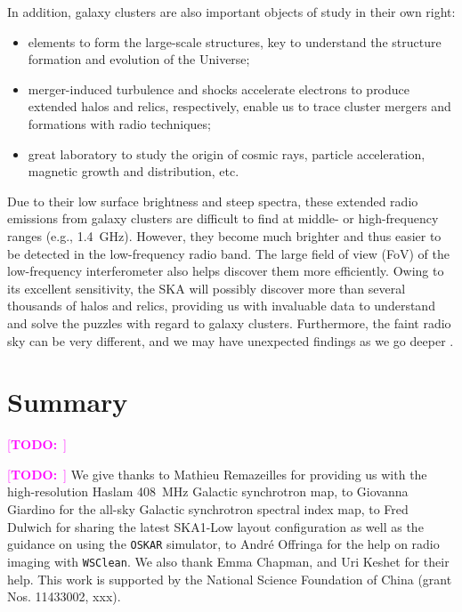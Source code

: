 \documentclass[modern]{aastex62}
\newcommand{\TODO}[1]{\textcolor{magenta}{[\textbf{TODO:}~\uuline{#1}]}}
\begin{document}
In addition, galaxy clusters are also important objects of study in their
own right:
\begin{itemize}
  \item elements to form the large-scale structures, key to understand the
    structure formation and evolution of the Universe;
  \item merger-induced turbulence and shocks accelerate electrons to produce
    extended halos and relics, respectively, enable us to trace cluster
    mergers and formations with radio techniques;
  \item great laboratory to study the origin of cosmic rays, particle
    acceleration, magnetic growth and distribution, etc.
\end{itemize}

Due to their low surface brightness and steep spectra, these extended
radio emissions from galaxy clusters are difficult to find at middle-
or high-frequency ranges (e.g., \SI{1.4}{\GHz}).
However, they become much brighter and thus easier to be detected in
the low-frequency radio band.  The large field of view (FoV) of the
low-frequency interferometer also helps discover them more efficiently.
Owing to its excellent sensitivity, the SKA will possibly discover more
than several thousands of halos and relics, providing us with invaluable
data to understand and solve the puzzles with regard to galaxy clusters.
Furthermore, the faint radio sky can be very different, and we may have
unexpected findings as we go deeper \citep{padovani2016rev,herreraRuiz2017}.


\section{Summary}
\label{sec:summary}

\TODO{Write!!!}


\acknowledgments

\TODO{update}
We give thanks
to Mathieu Remazeilles for providing us with the high-resolution Haslam
\SI{408}{\MHz} Galactic synchrotron map,
to Giovanna Giardino for the all-sky Galactic synchrotron spectral index map,
to Fred Dulwich for sharing the latest SKA1-Low layout configuration as well
as the guidance on using the \texttt{OSKAR} simulator,
to Andr\'e Offringa for the help on radio imaging with \texttt{WSClean}.
We also thank Emma Chapman, and Uri Keshet for their help.
This work is supported by the National Science Foundation of China
(grant Nos. 11433002, xxx).
\end{document}
